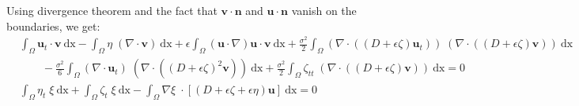 \documentclass[11pt,a4paper]{article}
\begin{document}
	Using divergence theorem and the fact that $\mathbf{v} \cdot \mathbf{n}$ and $\mathbf{u} \cdot \mathbf{n}$ vanish on the boundaries, we get: 
	\begin{equation}
		\begin{split}
			&\int_{\Omega} \! \mathbf{u}_t \cdot \mathbf{v} \: \mathrm{dx} - \int_{\Omega} \! \eta \; (\nabla \cdot \mathbf{v}) \: \mathrm{dx} + \epsilon \! \int_{\Omega} \! (\mathbf{u} \cdot \nabla ) \mathbf{u} \cdot \mathbf{v} \: \mathrm{dx} + \frac{\sigma^2}{2} \! \int_{\Omega} \!  (\nabla \cdot ((D + \epsilon \zeta) \mathbf{u}_t)) \; (\nabla \cdot ((D + \epsilon \zeta) \mathbf{v}) )\: \mathrm{dx} \\
			&\qquad - \frac{\sigma^2}{6} \! \int_{\Omega} \! (\nabla \cdot \mathbf{u}_t) \; (\nabla  \cdot ((D + \epsilon \zeta)^2  \mathbf{v})) \: \mathrm{dx} + \frac{\sigma^2}{2} \! \int_{\Omega} \!  \zeta_{tt}  \; (\nabla \cdot( (D + \epsilon \zeta) \mathbf{v})) \: \mathrm{dx} = 0\\
			 &\int_{\Omega}\! \eta_t \; \xi \: \mathrm{dx} +\int_{\Omega}\! \zeta_t \; \xi \: \mathrm{dx} -\int_{\Omega}\! \nabla \xi \; \cdot [(D + \epsilon \zeta+\epsilon\eta) \mathbf{u}]  \: \mathrm{dx} = 0
		\end{split} 
	\end{equation}
				
\end{document}
